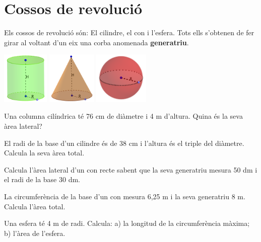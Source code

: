 \section{Cossos de revolució}

\begin{theorybox}
	Els cossos de revolució són: El cilindre, el con i l'esfera. Tots ells s'obtenen de fer girar al voltant d'un eix una corba anomenada \textbf{generatriu}.
	\begin{center}
		\includegraphics[height=2.5cm]{img-11/cilindro} \quad
			\includegraphics[height=2.5cm]{img-11/cono}  \quad
				\includegraphics[height=2.5cm]{img-11/esfera} 
	\end{center}
	
\end{theorybox}

\begin{mylist}
\exer Una columna cilíndrica té 76 cm de diàmetre i 4 m d'altura. Quina és la seva àrea lateral?

\exer  El radi de la base d'un cilindre és de 38 cm i l'altura és el triple del diàmetre. Calcula la seva àrea total.

\exer[1]  Calcula l'àrea lateral d'un con recte sabent que la seva generatriu mesura 50 dm i el radi de la base 30 dm.

\exer  La circumferència de la base d'un con mesura 6,25 m i la seva generatriu 8 m. Calcula l'àrea total.

\exer  Una esfera té 4 m de radi. Calcula: a) la longitud de la circumferència màxima; b) l'àrea de l'esfera.
\answers{[$L=8\pi=25.133$ m, $64\pi=201.062$ m$^2$]}

 
\end{mylist}


